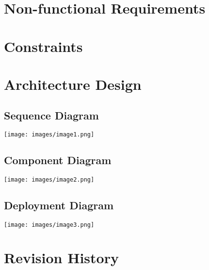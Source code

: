 \documentclass{article}
\begin{document}
\section{Non-functional Requirements}


\section{Constraints}


\section{Architecture Design}


\subsection{Sequence Diagram}
\texttt{[image: images/image1.png]}

\clearpage


\subsection{Component Diagram}
\texttt{[image: images/image2.png]}

\clearpage


\subsection{Deployment Diagram}
\texttt{[image: images/image3.png]}

\clearpage


\section{Revision History}
\end{document}
